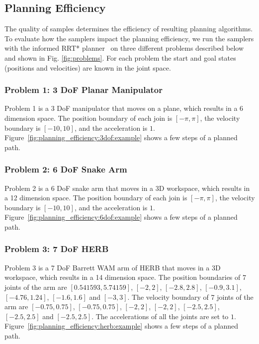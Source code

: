 \documentclass[letterpaper, 10 pt, conference]{ieeeconf}  %
\begin{document}

\subsection{Planning Efficiency}

The quality of samples determines the efficiency of resulting planning algorithms.
To evaluate how the samplers impact the planning efficiency, we run the samplers with the informed RRT* planner~\cite{GSB14} on three different problems described below and shown in Fig. \ref{fig:problems}. 
For each problem the start and goal states (positions and velocities) are known in the joint space.

\subsubsection{Problem 1: 3 DoF Planar Manipulator}

Problem 1 is a 3 DoF manipulator that moves on a plane, which results in a 6 dimension space.
The position boundary of each join is $ [ - \pi , \pi ] $, the velocity boundary is $ [-10, 10] $, and the acceleration is $ 1 $.
Figure~\ref{fig:planning_efficiency:3dof:example} shows a few steps of a planned path.

\subsubsection{Problem 2: 6 DoF Snake Arm}

Problem 2 is a 6 DoF snake arm that moves in a 3D workspace, which results in a 12 dimension space.
The position boundary of each join is $ [ - \pi , \pi ] $, the velocity boundary is $ [-10, 10] $, and the acceleration is $ 1 $.
Figure~\ref{fig:planning_efficiency:6dof:example} shows a few steps of a planned path.

\subsubsection{Problem 3: 7 DoF HERB}

Problem 3 is a 7 DoF Barrett WAM arm of HERB that moves in a 3D workspace, which results in a 14 dimension space.
The position boundaries of 7 joints of the arm are $  [0.541593 , 5.74159] $, $  [-2 , 2] $, $ [-2.8 , 2.8] $, $ [-0.9 , 3.1] $, $ [-4.76 , 1.24] $, $ [-1.6 , 1.6] $ and $ [-3 , 3] $.
The velocity boundary of 7 joints of the arm are $ [-0.75 , 0.75] $, $ [-0.75 , 0.75] $, $ [-2 , 2] $, $ [-2 , 2] $, $ [-2.5 , 2.5] $, $ [-2.5 , 2.5] $ and $ [-2.5 , 2.5] $.
The accelerations of all the joints are set to $ 1 $.
Figure~\ref{fig:planning_efficiency:herb:example} shows a few steps of a planned path.
\end{document}
